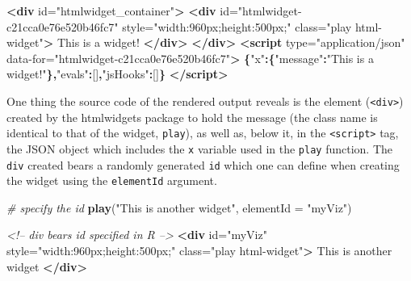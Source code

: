 \documentclass[10pt,]{krantz}
\makeatletter
\newenvironment{Shaded}{\begin{snugshade}}{\end{snugshade}}
\newcommand{\CommentTok}[1]{\textcolor[rgb]{0.37,0.37,0.37}{\textit{#1}}}
\newcommand{\DataTypeTok}[1]{\textcolor[rgb]{0.27,0.27,0.27}{#1}}
\newcommand{\KeywordTok}[1]{\textcolor[rgb]{0.27,0.27,0.27}{\textbf{#1}}}
\newcommand{\NormalTok}[1]{#1}
\newcommand{\OperatorTok}[1]{\textcolor[rgb]{0.43,0.43,0.43}{\textbf{#1}}}
\newcommand{\OtherTok}[1]{\textcolor[rgb]{0.37,0.37,0.37}{#1}}
\newcommand{\StringTok}[1]{\textcolor[rgb]{0.5,0.5,0.5}{#1}}
\newenvironment{kframe}{%
\medskip{}
\setlength{\fboxsep}{.8em}
 \def\at@end@of@kframe{}%
 \ifinner\ifhmode%
  \def\at@end@of@kframe{\end{minipage}}%
  \begin{minipage}{\columnwidth}%
 \fi\fi%
 \def\FrameCommand##1{\hskip\@totalleftmargin \hskip-\fboxsep
 \colorbox{shadecolor}{##1}\hskip-\fboxsep
     \hskip-\linewidth \hskip-\@totalleftmargin \hskip\columnwidth}%
 \MakeFramed {\advance\hsize-\width
   \@totalleftmargin\z@ \linewidth\hsize
   \@setminipage}}%
 {\par\unskip\endMakeFramed%
 \at@end@of@kframe}
\renewenvironment{Shaded}{\begin{kframe}}{\end{kframe}}
\makeatother
\begin{document}
\begin{Shaded}
\begin{Highlighting}[]
\KeywordTok{<div}\OtherTok{ id=}\StringTok{"htmlwidget_container"}\KeywordTok{>}
  \KeywordTok{<div} 
\OtherTok{    id=}\StringTok{"htmlwidget-c21cca0e76e520b46fc7"} 
\OtherTok{    style=}\StringTok{"width:960px;height:500px;"} 
\OtherTok{    class=}\StringTok{"play html-widget"}\KeywordTok{>}
\NormalTok{    This is a widget!}
  \KeywordTok{</div>}
\KeywordTok{</div>}
\KeywordTok{<script} 
\OtherTok{  type=}\StringTok{"application/json"} 
\OtherTok{  data-for=}\StringTok{"htmlwidget-c21cca0e76e520b46fc7"}\KeywordTok{>}
  \OperatorTok{\{}\StringTok{"x"}\OperatorTok{:\{}\StringTok{"message"}\OperatorTok{:}\StringTok{"This is a widget!"}\OperatorTok{\},}\StringTok{"evals"}\OperatorTok{:}\NormalTok{[]}\OperatorTok{,}\StringTok{"jsHooks"}\OperatorTok{:}\NormalTok{[]}\OperatorTok{\}}
\KeywordTok{</script>}
\end{Highlighting}
\end{Shaded}

One thing the source code of the rendered output reveals is the element (\texttt{\textless{}div\textgreater{}}) created by the htmlwidgets package to hold the message (the class name is identical to that of the widget, \texttt{play}), as well as, below it, in the \texttt{\textless{}script\textgreater{}} tag, the JSON object which includes the \texttt{x} variable used in the \texttt{play} function. The \texttt{div} created bears a randomly generated \texttt{id} which one can define when creating the widget using the \texttt{elementId} argument.

\begin{Shaded}
\begin{Highlighting}[]
\CommentTok{# specify the id}
\KeywordTok{play}\NormalTok{(}\StringTok{"This is another widget"}\NormalTok{, }\DataTypeTok{elementId =} \StringTok{"myViz"}\NormalTok{)}
\end{Highlighting}
\end{Shaded}

\begin{Shaded}
\begin{Highlighting}[]
\CommentTok{<!-- div bears id specified in R -->}
\KeywordTok{<div}\OtherTok{ id=}\StringTok{"myViz"} 
\OtherTok{  style=}\StringTok{"width:960px;height:500px;"} 
\OtherTok{  class=}\StringTok{"play html-widget"}\KeywordTok{>}
\NormalTok{  This is another widget}
\KeywordTok{</div>}
\end{Highlighting}
\end{Shaded}
\end{document}
